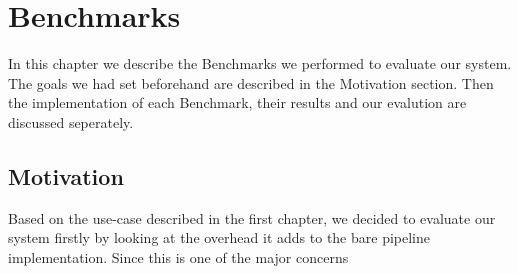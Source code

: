 \chapter{Benchmarks}

In this chapter we describe the Benchmarks we performed to evaluate our system. 
The goals we had set beforehand are described in the Motivation section. 
Then the implementation of each Benchmark, their results and our evalution are discussed seperately.

\section{Motivation}

Based on the use-case described in the first chapter, we decided to evaluate our system firstly by looking at the overhead it adds to the bare pipeline implementation. Since this is one of the major concerns




